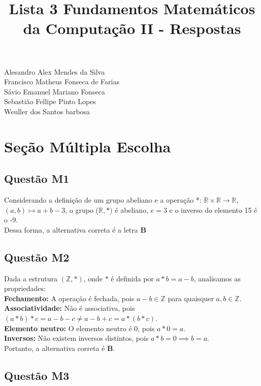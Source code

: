 \documentclass{article}
\title{Lista 3 Fundamentos Matemáticos da Computação II - Respostas}
\begin{document}
\maketitle

\begin{center}
Alesandro Alex Mendes da Silva \\
Francisco Matheus Fonseca de Farias \\
Sávio Emanuel Mariano Fonseca \\
Sebastião Fellipe Pinto Lopes \\
Weuller dos Santos barbosa \\
\end{center}


\section{Seção Múltipla Escolha}

\subsection{Questão M1} 
Considerando a definição de um grupo abeliano e a operação
*: $\mathbb{R}\times\mathbb{R} \xrightarrow{} \mathbb{R}$, $(a,b) \mapsto a+b-3$, o grupo ($\mathbb{R},*)$ é abeliano, $e=3$ e o inverso do elemento 15 é o -9. \\

Dessa forma, a alternativa correta é a letra \textbf{B}


\subsection{Questão M2}
Dada a estrutura $(\mathbb{Z}, \ast)$, onde $\ast$ é definida por $a \ast b = a - b$, analisamos as propriedades:\\
\textbf{Fechamento:}  
A operação é fechada, pois $a - b \in \mathbb{Z}$ para quaisquer $a, b \in \mathbb{Z}$.\\
\textbf{Associatividade:}  
Não é associativa, pois $(a \ast b) \ast c = a - b - c \neq a - b + c = a \ast (b \ast c)$.\\
\textbf{Elemento neutro:}  
O elemento neutro é $0$, pois $a \ast 0 = a$.\\
\textbf{Inversos:}  
Não existem inversos distintos, pois $a \ast b = 0 \implies b = a$.\\

Portanto, a alternativa correta é \textbf{B}.

\subsection{Questão M3}
\end{document}

